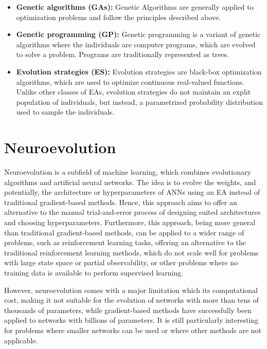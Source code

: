 \begin{itemize}
    \item \textbf{Genetic algorithms (GAs):} Genetic Algorithms are generally applied to optimization problems and follow the principles described above.
    \item \textbf{Genetic programming (GP):} Genetic programming is a variant of genetic algorithms where the individuals are computer programs, which are evolved to solve a problem.
        Programs are traditionally represented as trees.
    \item \textbf{Evolution strategies (ES):} Evolution strategies are black-box optimization algorithms, which are used to optimize continuous real-valued functions.
        Unlike other classes of EAs, evolution strategies do not maintain an explit population of individuals, but instead, a parametrized probability distribution
        used to sample the individuals.
\end{itemize}

\section{Neuroevolution}

Neuroevolution is a subfield of machine learning, which combines evolutionary algorithms and artificial neural networks. The idea is to evolve the weights,
and potentially, the architecture or hyperparameters of ANNs using an EA instead of traditional gradient-based methods. Hence, this approach aims to
offer an alternative to the manual trial-and-error process of designing suited architectures and choosing hyperparameters. Furthermore, this approach,
being more general than traditional gradient-based methods, can be applied to a wider range of problems, such as reinforcement learning tasks, offering an
alternative to the traditional reinforcement learning methods, which do not scale well for problems with large state space or partial observability,
or other problems where no training data is available to perform supervised learning.

However, neuroevolution comes with a major limitation which its computational cost, making it not suitable for the evolution of networks with more than
tens of thousands of parameters, while gradient-based methods have successfully been applied to networks with billions of parameters. It is still particularly
interesting for problems where smaller networks can be used or where other methods are not applicable.

